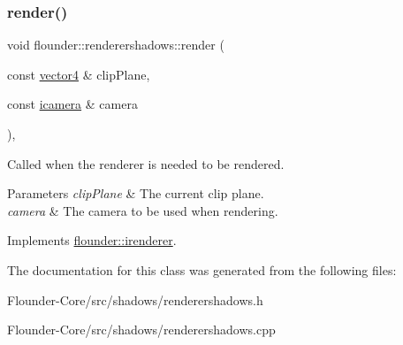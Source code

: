 \subsubsection{\texorpdfstring{render()}{render()}}
{\footnotesize\ttfamily void flounder\+::renderershadows\+::render (\begin{DoxyParamCaption}\item[{const \hyperlink{classflounder_1_1vector4}{vector4} \&}]{clip\+Plane,  }\item[{const \hyperlink{classflounder_1_1icamera}{icamera} \&}]{camera }\end{DoxyParamCaption})\hspace{0.3cm}{\ttfamily [override]}, {\ttfamily [virtual]}}



Called when the renderer is needed to be rendered. 


\begin{DoxyParams}{Parameters}
{\em clip\+Plane} & The current clip plane. \\
\hline
{\em camera} & The camera to be used when rendering. \\
\hline
\end{DoxyParams}


Implements \hyperlink{classflounder_1_1irenderer_a3f355dc39e2680bf3f3441d3dfaaa010}{flounder\+::irenderer}.



The documentation for this class was generated from the following files\+:\begin{DoxyCompactItemize}
\item 
Flounder-\/\+Core/src/shadows/renderershadows.\+h\item 
Flounder-\/\+Core/src/shadows/renderershadows.\+cpp\end{DoxyCompactItemize}
